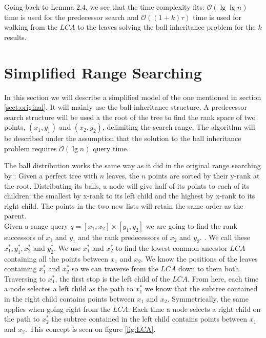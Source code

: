 Going back to Lemma $2.4$, we see that the time complexity fits: $\mathcal{O}(\lg \lg n)$ time is used for the predecessor search and $\mathcal{O}((1+k)\tau)$ time is used for walking from the $LCA$ to the leaves solving the ball inheritance problem for the $k$ results.

\section{Simplified Range Searching}

In this section we will describe a simplified model of the one mentioned in section \ref{sect:original}. It will mainly use the ball-inheritance structure. A predecessor search structure will be used a the root of the tree to find the rank space of two points, $(x_1,y_1)$ and $(x_2,y_2)$, delimiting the search range. The algorithm will be described under the assumption that the solution to the ball inheritance problem requires $\mathcal{O}(\lg n)$ query time.

The ball distribution works the same way as it did in the original range searching by \citeauthor{chanetal}: Given a perfect tree with $n$ leaves, the $n$ points are sorted by their y-rank at the root. Distributing its balls, a node will give half of its points to each of its children: the smallest by x-rank to its left child and the highest by x-rank to its right child. The points in the two new lists will retain the same order as the parent. \\

Given a range query $q = [x_1, x_2] \times [y_1, y_2]$ we are going to find the rank successors of $x_1$ and $y_1$ and the rank predecessors of $x_2$ and $y_2$. . We call these $x^*_1, y^*_1, x^*_2$ and $y^*_2$. We use $x^*_1$ and $x^*_2$ to find the lowest common ancestor $LCA$ containing all the points between $x_1$ and $x_2$. We know the positions of the leaves containing $x^*_1$ and $x^*_2$ so we can traverse from the $LCA$ down to them both. Traversing to $x^*_1$, the first stop is the left child of the $LCA$. From here, each time a node selectes a left child as the path to $x^*_1$ we know that the subtree contained in the right child contains points between $x_1$ and $x_2$. Symmetrically, the same applies when going right from the $LCA$: Each time a node selects a right child on the path to $x^*_2$ the subtree contained in the left child contains points between $x_1$ and $x_2$. This concept is seen on figure \ref{fig:LCA}. \\

